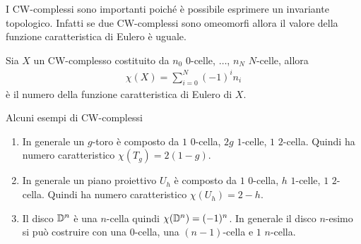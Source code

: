 I CW-complessi sono importanti poiché è possibile esprimere un invariante topologico. Infatti se due CW-complessi sono omeomorfi allora il valore della funzione caratteristica di Eulero è uguale. 

\begin{definition}
	Sia $X$ un CW-complesso costituito da $n_0$ $0$-celle, $\dots$, $n_N$ $N$-celle, allora 
	\begin{equation}
	\begin{aligned}
		\chi(X) = \sum_{i=0}^{N} (-1)^i n_i
	\end{aligned}
	\end{equation}
	è il numero della funzione caratteristica di Eulero di $X$. 
\end{definition}

\begin{remark}
	Alcuni esempi di CW-complessi
	\begin{enumerate}
		\item In generale un $g$-toro è composto da $1$ $0$-cella, $2g$ $1$-celle, $1$ $2$-cella. Quindi ha numero caratteristico $\chi(T_g) = 2(1-g)$. 
		\item In generale un piano proiettivo $U_h$ è composto da $1$ $0$-cella, $h$ $1$-celle, $1$ $2$-cella. Quindi ha numero caratteristico $\chi(U_h) = 2 - h$.
		\item Il disco $\mathbb{D}^n$ è una $n$-cella quindi $\chi(\mathbb{D}^n) = (-1)^n$. In generale il disco $n$-esimo si può costruire con una $0$-cella, una $(n-1)$-cella e $1$ $n$-cella.
	\end{enumerate}
\end{remark}

